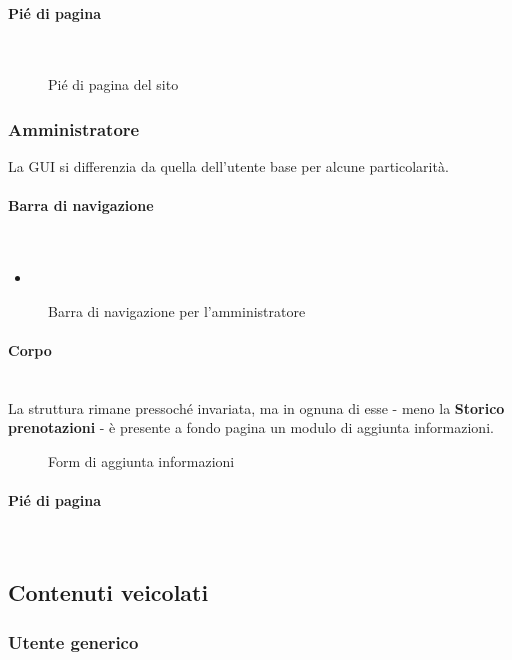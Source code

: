 \paragraph{Pié di pagina}
~\\

\begin{figure}[h!]
	\caption{Pié di pagina del sito}
	\label{fig:footer}
\end{figure}
\subsubsection{Amministratore}
La GUI si differenzia da quella dell'utente base per alcune particolarità.
\paragraph{Barra di navigazione}
~\\
\begin{itemize}
	\item \textbf{}
\end{itemize}

\begin{figure}[h!]
	\caption{Barra di navigazione per l'amministratore}
	\label{fig:navbarAD}
\end{figure}
\paragraph{Corpo}
~\\La struttura rimane pressoché invariata, ma in ognuna di esse - meno la \textbf{Storico prenotazioni} - è presente a fondo pagina un modulo di aggiunta informazioni.
\begin{figure}[h!]
	\caption{Form di aggiunta informazioni}
	\label{fig:addForm}
\end{figure}

\paragraph{Pié di pagina}
~\\
\subsection{Contenuti veicolati}

\subsubsection{Utente generico}

